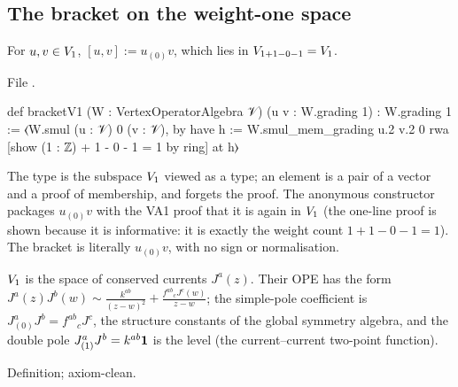 \subsection{The bracket on the weight-one space}

\begin{definition}\label{l04:def:bracket}
For $u,v\in V_1$, $[u,v] := u_{(0)}v$, which lies in $V_{1+1-0-1} = V_1$.
\end{definition}
\noindent File .
\begin{leancode}
def bracketV1 (W : VertexOperatorAlgebra 𝒱) (u v : W.grading 1) : W.grading 1 :=
  ⟨W.smul (u : 𝒱) 0 (v : 𝒱), by
    have h := W.smul_mem_grading u.2 v.2 0
    rwa [show (1 : ℤ) + 1 - 0 - 1 = 1 by ring] at h⟩
\end{leancode}
\begin{dictionary}
The type  is the subspace $V_1$ viewed as a type; an element is a pair of
a vector and a proof of membership, and  forgets the proof. The anonymous
constructor  packages $u_{(0)}v$ with the VA1 proof that it is again in
$V_1$ (the one-line proof is shown because it is informative: it is exactly the weight count
$1+1-0-1 = 1$). The bracket is literally $u_{(0)}v$, with no sign or normalisation.
\end{dictionary}
\begin{physics}
$V_1$ is the space of conserved currents $J^a(z)$. Their OPE has the form
$J^a(z)J^b(w)\sim \frac{k^{ab}}{(z-w)^2} + \frac{f^{ab}{}_c J^c(w)}{z-w}$; the simple-pole coefficient is
$J^a_{(0)}J^b = f^{ab}{}_cJ^c$, the structure constants of the global symmetry algebra, and the double
pole $J^a_{(1)}J^b = k^{ab}\mathbf{1}$ is the level (the current--current two-point function).
\end{physics}
\begin{status}
Definition; axiom-clean.
\end{status}

